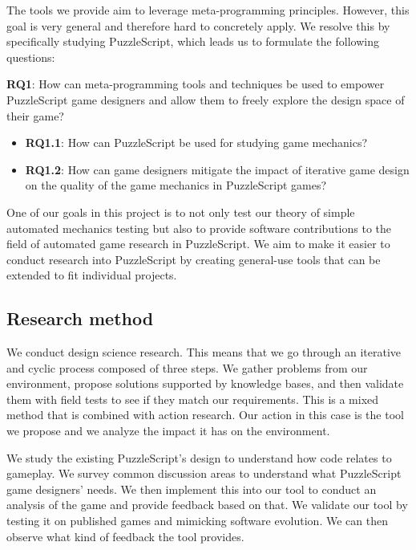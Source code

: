 The tools we provide aim to leverage meta-programming principles. However, this goal is very general and therefore hard to concretely apply. We resolve this by specifically studying PuzzleScript, which leads us to formulate the following questions:

\textbf{RQ1}: How can meta-programming tools and techniques be used to empower PuzzleScript game designers and allow them to freely explore the design space of their game?
\begin{itemize}
    \item \textbf{RQ1.1}: How can PuzzleScript be used for studying game mechanics?
    \item \textbf{RQ1.2}: How can game designers mitigate the impact of iterative game design on the quality of the game mechanics in PuzzleScript games?
\end{itemize}

One of our goals in this project is to not only test our theory of simple automated mechanics testing but also to provide software contributions to the field of automated game research in PuzzleScript. We aim to make it easier to conduct research into PuzzleScript by creating general-use tools that can be extended to fit individual projects.


\subsection{Research method}
We conduct design science research\cite{dr2}. This means that we go through an iterative and cyclic process composed of three steps. We gather problems from our environment, propose solutions supported by knowledge bases, and then validate them with field tests to see if they match our requirements. This is a mixed method that is combined with action research\cite{dr1}. Our action in this case is the tool we propose and we analyze the impact it has on the environment.

We study the existing PuzzleScript's design to understand how code relates to gameplay. We survey common discussion areas to understand what PuzzleScript game designers' needs. We then implement this into our tool to conduct an analysis of the game and provide feedback based on that. We validate our tool by testing it on published games and mimicking software evolution. We can then observe what kind of feedback the tool provides.

